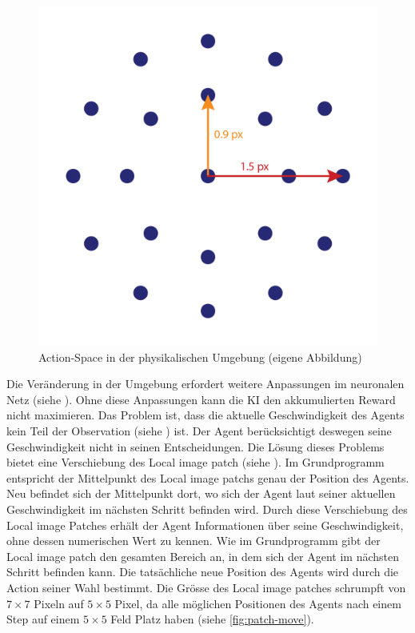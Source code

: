 \begin{figure}[!ht]
  \centering
  \includegraphics[width=\textwidth-6cm]{images/methode/physics-actionspace.png}
  \caption{Action-Space in der physikalischen Umgebung (eigene Abbildung)}
  \label{fig:physics-actionspace}
\end{figure}


Die Veränderung in der Umgebung erfordert weitere Anpassungen im neuronalen Netz
(siehe ). Ohne diese Anpassungen kann die KI den
akkumulierten Reward nicht maximieren. Das Problem ist, dass die aktuelle
Geschwindigkeit des Agents kein Teil der Observation (siehe
) ist. Der Agent berücksichtigt deswegen seine
Geschwindigkeit nicht in seinen Entscheidungen. Die Lösung dieses Problems
bietet eine Verschiebung des Local image patch (siehe ).
Im Grundprogramm entspricht der Mittelpunkt des Local image patchs genau der
Position des Agents. Neu befindet sich der Mittelpunkt dort, wo sich der Agent
laut seiner aktuellen Geschwindigkeit im nächsten Schritt befinden wird. Durch
diese Verschiebung des Local image Patches erhält der Agent Informationen über
seine Geschwindigkeit, ohne dessen numerischen Wert zu kennen. Wie im
Grundprogramm gibt der Local image patch den gesamten Bereich an, in dem sich
der Agent im nächsten Schritt befinden kann. Die tatsächliche neue Position des
Agents wird durch die Action seiner Wahl bestimmt. Die Grösse des Local image
patches schrumpft von $7\times7$ Pixeln auf $5\times5$ Pixel, da alle möglichen
Positionen des Agents nach einem Step auf einem $5\times5$ Feld Platz haben
(siehe \autoref{fig:patch-move}). 

